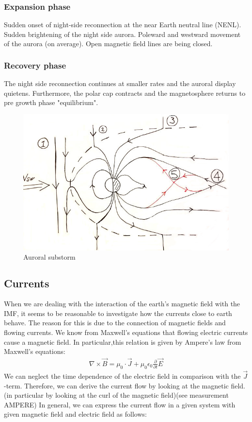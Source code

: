 \documentclass[10pt,a4paper]{article}
\begin{document}
\subsubsection{Expansion phase}
Sudden onset of night-side reconnection at the near Earth neutral line (NENL). Sudden brightening of the night side aurora. Poleward and westward movement of the 
aurora (on average). Open magnetic field lines are being closed. 
\subsubsection{Recovery phase}
The night side reconnection continues at smaller rates and the auroral display quietens. Furthermore, the polar cap contracts and the magnetosphere returns to pre 
growth phase "equilibrium". 
\begin{figure}[h]
\centering
\caption{Auroral substorm}
\label{aurora substorm}
\includegraphics[scale=0.5]{solvind2.jpg}
\end{figure}

\subsection{Currents \label{_CHAP_THEO_currents}}

When we are dealing with the interaction of the earth's magnetic field with the IMF, it seems to be reasonable to investigate how the currents close to earth behave.
The reason for this is due to the connection of magnetic fields and flowing currents. We know from Maxwell's equations that flowing electric currents cause a magnetic 
field. In particular,this relation is given by Ampere's law from Maxwell's equations:
\begin{align}
\nabla \times \vec{B}= \mu_0 \cdot \vec{J} + \mu_0 \epsilon_0 \frac{\partial }{\partial t} \vec{E}
\end{align}
We can neglect the time dependence of the electric field in comparison with the $\vec{J}$-term.  
Therefore, we can derive the current flow by looking at the magnetic field. (in particular by looking at the curl of the magnetic field)(see measurement AMPERE)
In general, we can express the current flow in a given system with given magnetic field and electric field as follows:
\end{document}
